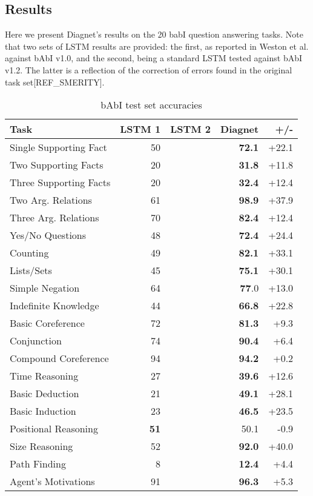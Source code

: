 \documentclass{article}
\begin{document}
 \subsection {Results}
 Here we present Diagnet's results on the 20 babI question answering tasks.  Note that two sets of LSTM results are provided: the first, as reported in Weston et al. against bAbI v1.0, and the second, being a standard LSTM tested against bAbI v1.2.  The latter is a reflection of the correction of errors found in the original task set[REF_SMERITY].
\begin{table}[h]

\centering
\caption{bAbI test set accuracies}
\begin{tabular}{|l|r|r|r|r|}
\hline
Task & LSTM 1 & LSTM 2 & Diagnet & +/- \\
\hline
Single Supporting Fact & 50 &  & \textbf{72.1} & +22.1 \\
Two Supporting Facts & 20 &  &\textbf{31.8} & +11.8 \\
Three Supporting Facts & 20 &  & \textbf{32.4} & +12.4 \\
Two Arg. Relations & 61 &  & \textbf{98.9} & +37.9 \\
Three Arg. Relations & 70 & & \textbf{82.4} & +12.4 \\
Yes/No Questions & 48 & & \textbf{72.4} & +24.4 \\
Counting & 49 &  & \textbf{82.1} & +33.1 \\
Lists/Sets & 45 & & \textbf{75.1} & +30.1 \\
Simple Negation & 64 &  &\textbf{77}.0 & +13.0 \\
Indefinite Knowledge & 44 & & \textbf{66.8} & +22.8 \\
Basic Coreference & 72 &  & \textbf{81.3} & +9.3 \\
Conjunction & 74 &  & \textbf{90.4} & +6.4 \\
Compound Coreference & 94 &  & \textbf{94.2} & +0.2 \\
Time Reasoning & 27 &  & \textbf{39.6} & +12.6 \\
Basic Deduction & 21 &  & \textbf{49.1} & +28.1 \\
Basic Induction & 23 &  & \textbf{46.5} & +23.5 \\
Positional Reasoning &  \textbf{51} &  & 50.1 & -0.9 \\
Size Reasoning & 52 &  & \textbf{92.0} & +40.0 \\
Path Finding & 8 &  & \textbf{12.4} & +4.4 \\
Agent's Motivations & 91 &  & \textbf{96.3} & +5.3 \\
\hline

\end{tabular}

\end{table}
\end{document}
